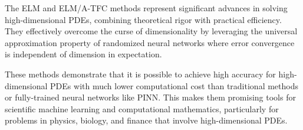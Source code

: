 \documentclass[11pt]{article}
\begin{document}
The ELM and ELM/A-TFC methods represent significant advances in solving high-dimensional PDEs, combining theoretical rigor with practical efficiency. They effectively overcome the curse of dimensionality by leveraging the universal approximation property of randomized neural networks where error convergence is independent of dimension in expectation.

These methods demonstrate that it is possible to achieve high accuracy for high-dimensional PDEs with much lower computational cost than traditional methods or fully-trained neural networks like PINN. This makes them promising tools for scientific machine learning and computational mathematics, particularly for problems in physics, biology, and finance that involve high-dimensional PDEs.
\end{document}
